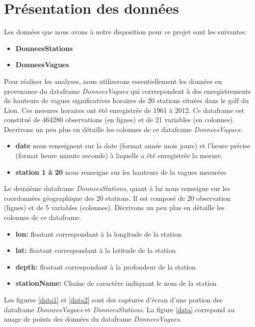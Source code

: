\documentclass[a4paper,french,10pt]{article}
\begin{document}
\section{Présentation des données}

Les données que nous avons à notre disposition pour ce projet sont les suivantes:
\begin{itemize}
	\item \textbf{DonneesStations}
	\item \textbf{DonneesVagues}
\end{itemize}
Pour réaliser les analyses, nous utiliserons essentiellement les données en provenance du dataframe \textit{DonneesVagues} qui correspondent à des enregistrements de hauteurs de vagues significatives horaires de 20 stations situées dans le golf du Lion. Ces mesures horaires ont été enregistrée de 1961 à 2012. Ce dataframe est constitué de 464280 observations (en lignes) et de 21 variables (en colonnes). Decrivons un peu plus en détaille les colonnes de ce dataframe \textit{DonneesVagues}:
\begin{itemize}
	\item \textbf{date} nous renseignent sur la date (format année mois jours) et l'heure précise (format heure minute seconde) à laquelle a été enregistrée la mesure.
	\item \textbf{station 1 à 20} nous renseigne sur les hauteurs de la vagues mesurées
\end{itemize}
Le deuxième dataframe \textit{DonneesStations}, quant à lui nous renseigne sur les coordonnées géographique des 20 stations. Il est composé de 20 observation (lignes) et de 5 variables (colonnes). Décrivons un peu plus en détaille les colonnes de ce dataframe.
\begin{itemize}
	\item \textbf{lon:} floatant correspondant à la longitude de la station
	\item \textbf{lat:} floatant correspondant à la latitude de la station
	\item \textbf{depth:} floatant correspondant à la profondeur de la station
	\item \textbf{stationName:} Chaine de caractère indiquant le nom de la station
\end{itemize}
Les figures \ref{data1} et \ref{data2} sont des captures d'écran d'une portion des dataframe \textit{DonneesVagues} et \textit{DonneesStations}. La figure \ref{data} correpond au nuage de points des données du dataframe \textit{DonneesVagues}.
\end{document}
